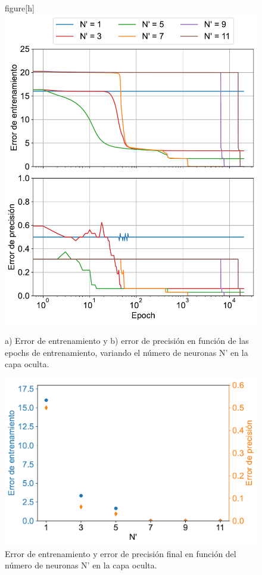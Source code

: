 \documentclass[aps,prb,twocolumn,superscriptaddress,floatfix,longbibliography]{revtex4-2}
\begin{document}
\begin{figure}
    {figure}[h]
        \includegraphics[clip=true,width=\columnwidth]{ej2_vs_epochs.pdf}
        \caption{a) Error de entrenamiento y b) error de precisión en función de las epochs de entrenamiento, variando el número de neuronas N’ en la capa oculta.}
         \label{fig:ej2_error}
\end{figure}
    
    

\begin{figure}[h]
    \includegraphics[clip=true,width=\columnwidth]{ej2_vs_N_prima.pdf}
    \caption{Error de entrenamiento y error de precisión final en función del número de neuronas N' en la capa oculta.}
        \label{fig:ej2_error_vs_Nprima}
\end{figure}
\end{document}
